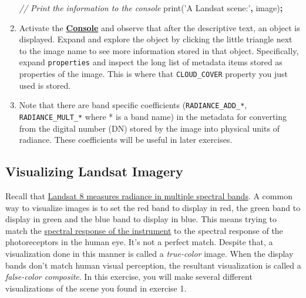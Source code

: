 \documentclass[
]{article}
\newenvironment{Shaded}{\begin{snugshade}}{\end{snugshade}}
\newcommand{\AttributeTok}[1]{\textcolor[rgb]{0.77,0.63,0.00}{#1}}
\newcommand{\CommentTok}[1]{\textcolor[rgb]{0.56,0.35,0.01}{\textit{#1}}}
\newcommand{\NormalTok}[1]{#1}
\newcommand{\OperatorTok}[1]{\textcolor[rgb]{0.81,0.36,0.00}{\textbf{#1}}}
\newcommand{\StringTok}[1]{\textcolor[rgb]{0.31,0.60,0.02}{#1}}
\begin{document}
\begin{enumerate}
\begin{Shaded}
\begin{Highlighting}[]
  \CommentTok{//  Print the information to the console }
  \AttributeTok{print}\NormalTok{(}\StringTok{'A Landsat scene:'}\OperatorTok{,}\NormalTok{ image)}\OperatorTok{;}  
\end{Highlighting}
\end{Shaded}
\item
  Activate the \href{https://developers.google.com/earth-engine/playground\#console-tab}{\textbf{Console}} and observe that after the descriptive text, an object is displayed. Expand and explore the object by clicking the little triangle next to the image name to see more information stored in that object. Specifically, expand \texttt{properties} and inspect the long list of metadata items stored as properties of the image. This is where that \texttt{CLOUD\_COVER} property you just used is stored.
\item
  Note that there are band specific coefficients (\texttt{RADIANCE\_ADD\_*}, \texttt{RADIANCE\_MULT\_*} where * is a band name) in the metadata for converting from the digital number (DN) stored by the image into physical units of radiance. These coefficients will be useful in later exercises.
\end{enumerate}

\hypertarget{visualizing-landsat-imagery}{%
\subsection{Visualizing Landsat Imagery}\label{visualizing-landsat-imagery}}

Recall that \href{https://svs.gsfc.nasa.gov/cgi-bin/details.cgi?aid=11491}{Landsat 8 measures radiance in multiple spectral bands}. A common way to visualize images is to set the red band to display in red, the green band to display in green and the blue band to display in blue. This means trying to match the \href{http://landsat.gsfc.nasa.gov/?p=5779}{spectral response of the instrument} to the spectral response of the photoreceptors in the human eye. It's not a perfect match. Despite that, a visualization done in this manner is called a \emph{true-color} image. When the display bands don't match human visual perception, the resultant visualization is called a \emph{false-color composite}. In this exercise, you will make several different visualizations of the scene you found in exercise 1.
\end{document}
